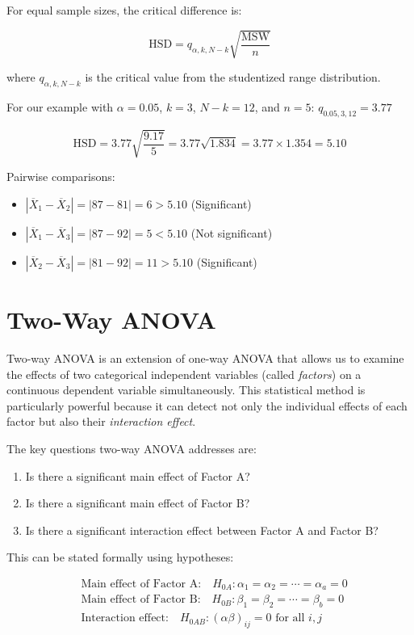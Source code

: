 \documentclass[twoside]{book}
\begin{document}
For equal sample sizes, the critical difference is:

\begin{equation}
\text{HSD} = q_{\alpha, k, N-k} \sqrt{\frac{\text{MSW}}{n}}
\end{equation}

where $q_{\alpha, k, N-k}$ is the critical value from the studentized range distribution.

For our example with $\alpha = 0.05$, $k = 3$, $N-k = 12$, and $n = 5$:
$q_{0.05, 3, 12} = 3.77$

\begin{equation}
\text{HSD} = 3.77 \sqrt{\frac{9.17}{5}} = 3.77 \sqrt{1.834} = 3.77 \times 1.354 = 5.10
\end{equation}

Pairwise comparisons:
\begin{itemize}
\item $|\overline{X}_1 - \overline{X}_2| = |87 - 81| = 6 > 5.10$ (Significant)
\item $|\overline{X}_1 - \overline{X}_3| = |87 - 92| = 5 < 5.10$ (Not significant)
\item $|\overline{X}_2 - \overline{X}_3| = |81 - 92| = 11 > 5.10$ (Significant)
\end{itemize}

\section{Two-Way ANOVA}

Two-way ANOVA is an extension of one-way ANOVA that allows us to examine the effects of two categorical independent variables (called \textit{factors}) on a continuous dependent variable simultaneously. This statistical method is particularly powerful because it can detect not only the individual effects of each factor but also their \textit{interaction effect}.

The key questions two-way ANOVA addresses are:
\begin{enumerate}
\item Is there a significant main effect of Factor A?
\item Is there a significant main effect of Factor B?
\item Is there a significant interaction effect between Factor A and Factor B?
\end{enumerate}

This can be stated formally using hypotheses:
\begin{textbox}
\begin{align*}
&\text{Main effect of Factor A:} \quad H_{0A}: \alpha_1 = \alpha_2 = \cdots = \alpha_a = 0\\
&\text{Main effect of Factor B:} \quad H_{0B}: \beta_1 = \beta_2 = \cdots = \beta_b = 0\\
&\text{Interaction effect:} \quad H_{0AB}: (\alpha\beta)_{ij} = 0 \text{ for all } i,j
\end{align*}
\end{textbox}
\end{document}
